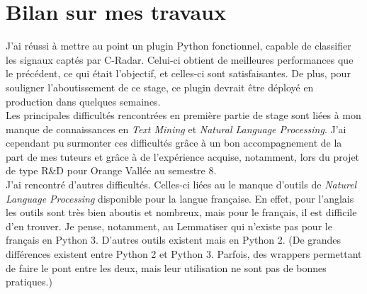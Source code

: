 \section{Bilan sur mes travaux}
    J'ai réussi à mettre au point un plugin Python fonctionnel, capable de classifier les signaux captés par C-Radar. Celui-ci obtient de meilleures performances que le précédent, ce qui était l'objectif, et celles-ci sont satisfaisantes. De plus, pour souligner l'aboutissement de ce stage, ce plugin devrait être déployé en production dans quelques semaines.\\

    Les principales difficultés rencontrées en première partie de stage sont liées à mon manque de connaissances en \textit{Text Mining} et \textit{Natural Language Processing}. J'ai cependant pu surmonter ces difficultés grâce à un bon accompagnement de la part de mes tuteurs et grâce à de l’expérience acquise, notamment, lors du projet de type R\&D pour Orange Vallée au semestre 8.\\

    J'ai rencontré d'autres difficultés. Celles-ci liées au le manque d'outils de \textit{Naturel Language Processing} disponible pour la langue française. En effet, pour l'anglais les outils sont très bien aboutis et nombreux, mais pour le français, il est difficile d'en trouver. Je pense, notamment, au Lemmatiser qui n'existe pas pour le français en Python 3. D'autres outils existent mais en Python 2. (De grandes différences existent entre Python 2 et Python 3. Parfois, des wrappers permettant de faire le pont entre les deux, mais leur utilisation ne sont pas de bonnes pratiques.)\\

